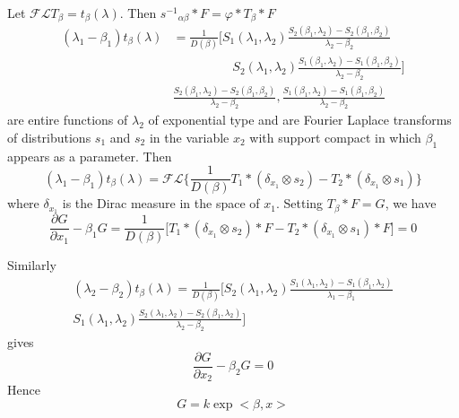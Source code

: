Let $\mathscr{F} \mathcal{L} T_\beta = t_\beta (\lambda)$. Then
$s^{-1}{_{\alpha \beta}}* F=\varphi * T_{\beta}* F$ 
\begin{align*}
(\lambda_1 -\beta_1) t_\beta (\lambda) & = \frac{1}{D (\beta)} \bigg[
  S_1 (\lambda_1, \lambda_2) \frac{S_2 (\beta_1,\lambda_2)-
    S_2(\beta_1, \beta_2)}{\lambda_2- \beta_2}\\ 
  & \hspace{2cm}S_2 (\lambda_1, \lambda_2) \frac{S_1 (\beta_1,
    \lambda_2) -S_1 (\beta_1, \beta_2)}{\lambda_2 -\beta_2}\bigg]\\
  & \frac{S_2 (\beta_1, \lambda_2) - S_2 (\beta_1, \beta_2)}{\lambda_2
    -\beta_2}, \frac{S_1 (\beta_1, \lambda_2) - S_1 (\beta_1,
    \beta_2)}{\lambda_2 -\beta_2} 
\end{align*}
are entire functions of $\lambda_2$ of exponential type and are Fourier
Laplace transforms of distributions $s_1$ and $s_2$ in the variable
$x_2$ with support compact in which $\beta_1$ appears as a
parameter. Then 
$$
(\lambda_1 -\beta_1) t_\beta (\lambda) = \mathscr{F} \mathcal{L}
\bigg\{ \frac{1}{D (\beta)} T_1 * (\delta_{x_1}\otimes s_2)- T_2 *
(\delta_{x_1}\otimes s_1)\bigg\} 
$$
where $\delta_{x_1}$ is the Dirac measure in the space of
$x_1$. Setting $T_\beta * F = G$, we have 
$$
\frac{\partial G}{\partial x_1} -\beta_1 G = \frac{1}{D (\beta)} \bigg[
  T_1 * (\delta_{x_1}\otimes s_2) * F -T_2 * (\delta_{x_1}\otimes s_1)
  * F\bigg] = 0 
$$

Similarly 
\begin{multline}
(\lambda_2 - \beta_2)t_\beta (\lambda) = \frac{1}{D (\beta)} \Bigg[
  S_2 (\lambda_1, \lambda_2) \frac{S_1 (\lambda_1, \lambda_2) -S_1
    (\beta_1, \lambda_2)} {\lambda_1- \beta_1}\\ 
  S_1 (\lambda_1, \lambda_2)  \frac{S_2 (\lambda_1, \lambda_2) -S_2
    (\beta_1, \lambda_2)} {\lambda_2- \beta_2}\Bigg] 
\end{multline}
gives\pageoriginale
$$
\frac{\partial G}{\partial x_2} - \beta_2 G =0
$$
Hence
$$
G = k \exp <\beta, x> 
$$

